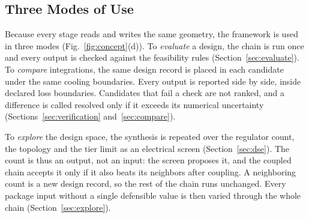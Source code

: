 \subsection{Three Modes of Use}\label{sec:fw-modes}
Because every stage reads and writes the same geometry, the framework is used in three modes
(Fig.~\ref{fig:concept}(d)). To \emph{evaluate} a design, the chain is run once and every output is
checked against the feasibility rules (Section~\ref{sec:evaluate}). To \emph{compare}
integrations, the same design record is placed in each candidate under the same cooling
boundaries. Every output is reported side by side, inside declared loss boundaries. Candidates
that fail a check are not ranked, and a difference is called resolved only if it exceeds its
numerical uncertainty (Sections~\ref{sec:verification} and~\ref{sec:compare}).

To \emph{explore} the design space, the synthesis is repeated over the regulator count, the
topology and the tier limit as an electrical screen (Section~\ref{sec:dse}). The count is thus an
output, not an input: the screen proposes it, and the coupled chain accepts it only if it also
beats its neighbors after coupling. A neighboring count is a new design record, so the rest of
the chain runs unchanged. Every package input without a single defensible value is then varied
through the whole chain (Section~\ref{sec:explore}).
